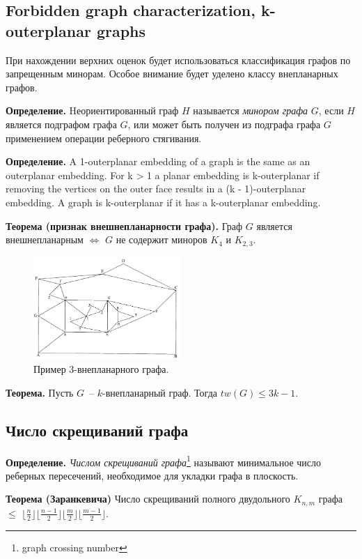 \documentclass[12pt]{article}
\begin{document}
\subsection{Forbidden graph characterization, k-outerplanar graphs}
При нахождении верхних оценок будет использоваться классификация графов по запрещенным минорам.
Особое внимание будет уделено классу внепланарных графов.

\textbf{Определение.}
Hеориентированный граф $H$ называется \textit{минором графа} $G$, если $H$
является подграфом графа $G$, или может быть получен из подграфа графа $G$ применением операции реберного стягивания.

\textbf{Определение.}
A 1-outerplanar embedding of a graph is the same as an outerplanar embedding. 
For k > 1 a planar embedding is k-outerplanar if removing the vertices on the outer
face results in a (k - 1)-outerplanar embedding. A graph is k-outerplanar if it has a 
k-outerplanar embedding.

\textbf{Теорема (признак внешнепланарности графа).}
Граф $G$ является внешнепланарным $\iff$ $G$ не содержит миноров $K_4$ и $K_{2,3}$\cite{Diestel00}.

\begin{figure}[htb]
\centering
\includegraphics[width=0.50\textwidth]{outerplanar.png}
\caption{Пример 3-внепланарного графа.}
\label{fig:outerplanar_graph}
\end{figure}

\textbf{Теорема.}
Пусть $G$~-- $k$-внепланарный граф. Тогда $tw(G) \leq 3k-1.$\cite{Boedlander96}

\subsection{Число скрещиваний графа}

\textbf{Определение.} \textit{Числом скрещиваний графа}\footnote{graph crossing number} называют 
минимальное число реберных пересечений, необходимое для укладки графа в плоскость.

\label{ZarankTheorem}
\textbf{Теорема (Заранкевича)} Число скрещиваний полного двудольного $K_{n,m}$ графа $\leq$
$\lfloor \frac{n}{2} \rfloor \lfloor \frac{n-1}{2} \rfloor \lfloor \frac{m}{2} \rfloor \lfloor \frac{m-1}{2} \rfloor$.
\cite{Zarank54}
\end{document}
